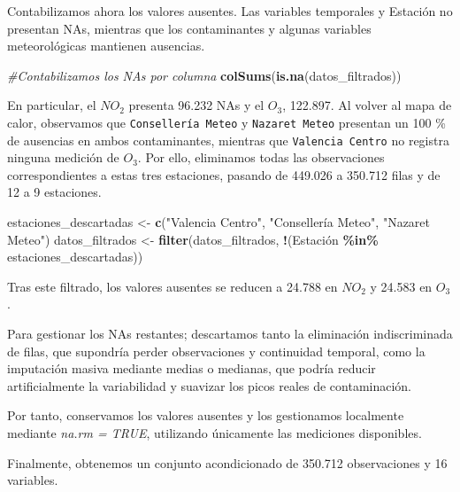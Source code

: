 \documentclass[notspecified,article,submit,oneauthor,pdftex]{Definitions/mdpi}
\newenvironment{Shaded}{\begin{snugshade}}{\end{snugshade}}
\newcommand{\CommentTok}[1]{\textcolor[rgb]{0.56,0.35,0.01}{\textit{#1}}}
\newcommand{\FunctionTok}[1]{\textcolor[rgb]{0.13,0.29,0.53}{\textbf{#1}}}
\newcommand{\NormalTok}[1]{#1}
\newcommand{\OtherTok}[1]{\textcolor[rgb]{0.56,0.35,0.01}{#1}}
\newcommand{\SpecialCharTok}[1]{\textcolor[rgb]{0.81,0.36,0.00}{\textbf{#1}}}
\newcommand{\StringTok}[1]{\textcolor[rgb]{0.31,0.60,0.02}{#1}}
\begin{document}
Contabilizamos ahora los valores ausentes. Las variables temporales y
Estación no presentan NAs, mientras que los contaminantes y algunas
variables meteorológicas mantienen ausencias.

\begin{Shaded}
\begin{Highlighting}[]
\CommentTok{\#Contabilizamos los NAs por columna}
\FunctionTok{colSums}\NormalTok{(}\FunctionTok{is.na}\NormalTok{(datos\_filtrados))}
\end{Highlighting}
\end{Shaded}

En particular, el \(NO_2\) presenta 96.232 NAs y el \(O_3\), 122.897. Al
volver al mapa de calor, observamos que \texttt{Consellería\ Meteo} y
\texttt{Nazaret\ Meteo} presentan un 100 \% de ausencias en ambos
contaminantes, mientras que \texttt{Valencia\ Centro} no registra
ninguna medición de \(O_3\). Por ello, eliminamos todas las
observaciones correspondientes a estas tres estaciones, pasando de
449.026 a 350.712 filas y de 12 a 9 estaciones.

\begin{Shaded}
\begin{Highlighting}[]
\NormalTok{estaciones\_descartadas }\OtherTok{\textless{}{-}} \FunctionTok{c}\NormalTok{(}\StringTok{"Valencia Centro"}\NormalTok{, }\StringTok{"Consellería Meteo"}\NormalTok{, }\StringTok{"Nazaret Meteo"}\NormalTok{)}
\NormalTok{datos\_filtrados }\OtherTok{\textless{}{-}} \FunctionTok{filter}\NormalTok{(datos\_filtrados, }\SpecialCharTok{!}\NormalTok{(Estación }\SpecialCharTok{\%in\%}\NormalTok{ estaciones\_descartadas))}
\end{Highlighting}
\end{Shaded}

Tras este filtrado, los valores ausentes se reducen a 24.788 en \(NO_2\)
y 24.583 en \(O_3\).

Para gestionar los NAs restantes; descartamos tanto la eliminación
indiscriminada de filas, que supondría perder observaciones y
continuidad temporal, como la imputación masiva mediante medias o
medianas, que podría reducir artificialmente la variabilidad y suavizar
los picos reales de contaminación.

Por tanto, conservamos los valores ausentes y los gestionamos localmente
mediante \emph{na.rm = TRUE}, utilizando únicamente las mediciones
disponibles.

Finalmente, obtenemos un conjunto acondicionado de 350.712 observaciones
y 16 variables.
\end{document}
